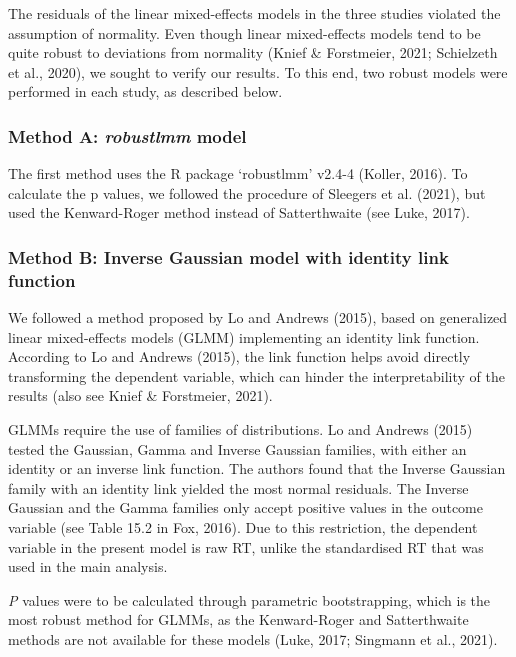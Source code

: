 \documentclass[
  12pt,
  man,floatsintext]{apa7}
\begin{document}
The residuals of the linear mixed-effects models in the three studies violated the assumption of normality. Even though linear mixed-effects models tend to be quite robust to deviations from normality (Knief \& Forstmeier, 2021; Schielzeth et al., 2020), we sought to verify our results. To this end, two robust models were performed in each study, as described below.

\hypertarget{method-a-robustlmm-model}{%
\subsubsection{\texorpdfstring{Method A: \emph{robustlmm} model}{Method A: robustlmm model}}\label{method-a-robustlmm-model}}

The first method uses the R package `robustlmm' v2.4-4 (Koller, 2016). To calculate the p values, we followed the procedure of Sleegers et al. (2021), but used the Kenward-Roger method instead of Satterthwaite (see Luke, 2017).

\hypertarget{method-b-inverse-gaussian-model-with-identity-link-function}{%
\subsubsection{Method B: Inverse Gaussian model with identity link function}\label{method-b-inverse-gaussian-model-with-identity-link-function}}

We followed a method proposed by Lo and Andrews (2015), based on generalized linear mixed-effects models (GLMM) implementing an identity link function. According to Lo and Andrews (2015), the link function helps avoid directly transforming the dependent variable, which can hinder the interpretability of the results (also see Knief \& Forstmeier, 2021).

GLMMs require the use of families of distributions. Lo and Andrews (2015) tested the Gaussian, Gamma and Inverse Gaussian families, with either an identity or an inverse link function. The authors found that the Inverse Gaussian family with an identity link yielded the most normal residuals. The Inverse Gaussian and the Gamma families only accept positive values in the outcome variable (see Table 15.2 in Fox, 2016). Due to this restriction, the dependent variable in the present model is raw RT, unlike the standardised RT that was used in the main analysis.

\emph{P} values were to be calculated through parametric bootstrapping, which is the most robust method for GLMMs, as the Kenward-Roger and Satterthwaite methods are not available for these models (Luke, 2017; Singmann et al., 2021).
\end{document}
